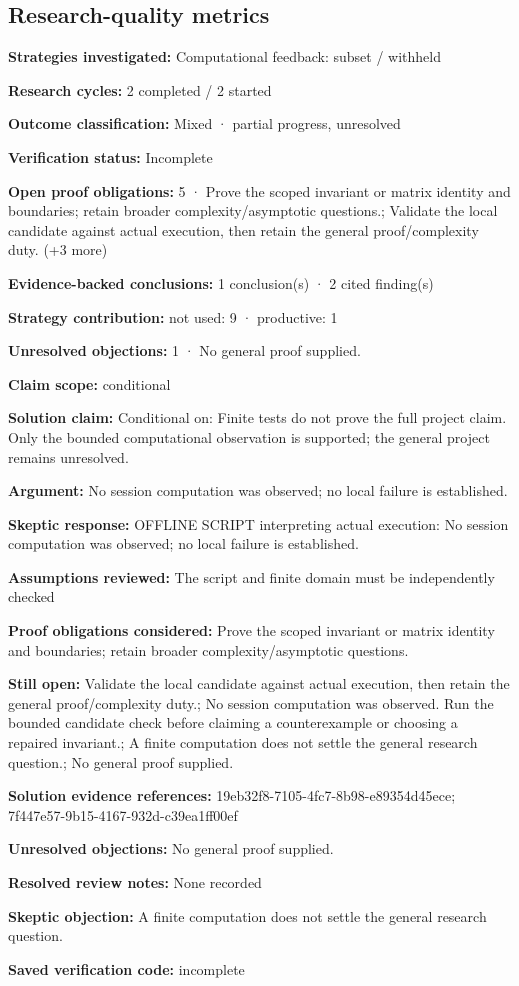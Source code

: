 \documentclass[11pt]{article}
\begin{document}
\subsection{Research-quality metrics}
\textbf{Strategies investigated:} Computational feedback: subset / withheld\par
\textbf{Research cycles:} 2 completed / 2 started\par
\textbf{Outcome classification:} Mixed · partial progress, unresolved\par
\textbf{Verification status:} Incomplete\par
\textbf{Open proof obligations:} 5 · Prove the scoped invariant or matrix identity and boundaries; retain broader complexity/asymptotic questions.; Validate the local candidate against actual execution, then retain the general proof/complexity duty. (+3 more)\par
\textbf{Evidence-backed conclusions:} 1 conclusion(s) · 2 cited finding(s)\par
\textbf{Strategy contribution:} not used: 9 · productive: 1\par
\textbf{Unresolved objections:} 1 · No general proof supplied.\par
\textbf{Claim scope:} conditional\par
\textbf{Solution claim:} Conditional on: Finite tests do not prove the full project claim. Only the bounded computational observation is supported; the general project remains unresolved.\par
\textbf{Argument:} No session computation was observed; no local failure is established.\par
\textbf{Skeptic response:} OFFLINE SCRIPT interpreting actual execution: No session computation was observed; no local failure is established.\par
\textbf{Assumptions reviewed:} The script and finite domain must be independently checked\par
\textbf{Proof obligations considered:} Prove the scoped invariant or matrix identity and boundaries; retain broader complexity/asymptotic questions.\par
\textbf{Still open:} Validate the local candidate against actual execution, then retain the general proof/complexity duty.; No session computation was observed. Run the bounded candidate check before claiming a counterexample or choosing a repaired invariant.; A finite computation does not settle the general research question.; No general proof supplied.\par
\textbf{Solution evidence references:} 19eb32f8-7105-4fc7-8b98-e89354d45ece; 7f447e57-9b15-4167-932d-c39ea1ff00ef\par
\textbf{Unresolved objections:} No general proof supplied.\par
\textbf{Resolved review notes:} None recorded\par
\textbf{Skeptic objection:} A finite computation does not settle the general research question.\par
\textbf{Saved verification code:} incomplete\par
\end{document}
